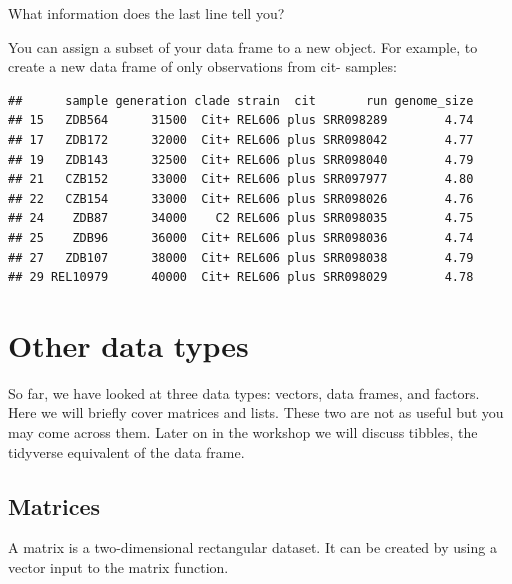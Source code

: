 \documentclass[
]{book}
\newenvironment{Shaded}{\begin{snugshade}}{\end{snugshade}}
\newcommand{\NormalTok}[1]{#1}
\newcommand{\OtherTok}[1]{\textcolor[rgb]{0.56,0.35,0.01}{#1}}
\newcommand{\SpecialCharTok}[1]{\textcolor[rgb]{0.00,0.00,0.00}{#1}}
\newcommand{\StringTok}[1]{\textcolor[rgb]{0.31,0.60,0.02}{#1}}
\begin{document}
What information does the last line tell you?

You can assign a subset of your data frame to a new object. For example, to create a new data frame of only observations from cit- samples:

\begin{Shaded}
\end{Shaded}

\begin{verbatim}
##      sample generation clade strain  cit       run genome_size
## 15   ZDB564      31500  Cit+ REL606 plus SRR098289        4.74
## 17   ZDB172      32000  Cit+ REL606 plus SRR098042        4.77
## 19   ZDB143      32500  Cit+ REL606 plus SRR098040        4.79
## 21   CZB152      33000  Cit+ REL606 plus SRR097977        4.80
## 22   CZB154      33000  Cit+ REL606 plus SRR098026        4.76
## 24    ZDB87      34000    C2 REL606 plus SRR098035        4.75
## 25    ZDB96      36000  Cit+ REL606 plus SRR098036        4.74
## 27   ZDB107      38000  Cit+ REL606 plus SRR098038        4.79
## 29 REL10979      40000  Cit+ REL606 plus SRR098029        4.78
\end{verbatim}

\hypertarget{other-data-types}{%
\section{Other data types}\label{other-data-types}}

So far, we have looked at three data types: vectors, data frames, and factors. Here we will briefly cover matrices and lists. These two are not as useful but you may come across them. Later on in the workshop we will discuss tibbles, the tidyverse equivalent of the data frame.

\hypertarget{matrices}{%
\subsection*{Matrices}\label{matrices}}

A matrix is a two-dimensional rectangular dataset. It can be created by using a vector input to the matrix function.
\end{document}
